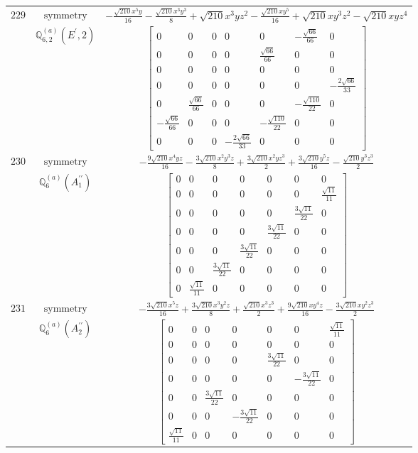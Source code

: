 \documentclass[fleqn,8pt,landscape]{jsarticle}
\begin{document}
\begin{longtable}{ccc}
$ 229 $ & $ \text{symmetry} $ & $ - \frac{\sqrt{210} x^{5} y}{16} - \frac{\sqrt{210} x^{3} y^{3}}{8} + \sqrt{210} x^{3} y z^{2} - \frac{\sqrt{210} x y^{5}}{16} + \sqrt{210} x y^{3} z^{2} - \sqrt{210} x y z^{4} $ \\
$  $ & $ \mathbb{Q}_{6,2}^{(a)}(E^{\prime},2) $ & $ \begin{bmatrix} 0 & 0 & 0 & 0 & 0 & - \frac{\sqrt{66}}{66} & 0 \\ 0 & 0 & 0 & 0 & \frac{\sqrt{66}}{66} & 0 & 0 \\ 0 & 0 & 0 & 0 & 0 & 0 & 0 \\ 0 & 0 & 0 & 0 & 0 & 0 & - \frac{2 \sqrt{66}}{33} \\ 0 & \frac{\sqrt{66}}{66} & 0 & 0 & 0 & - \frac{\sqrt{110}}{22} & 0 \\ - \frac{\sqrt{66}}{66} & 0 & 0 & 0 & - \frac{\sqrt{110}}{22} & 0 & 0 \\ 0 & 0 & 0 & - \frac{2 \sqrt{66}}{33} & 0 & 0 & 0 \end{bmatrix} $ \\ \hline
$ 230 $ & $ \text{symmetry} $ & $ - \frac{9 \sqrt{210} x^{4} y z}{16} - \frac{3 \sqrt{210} x^{2} y^{3} z}{8} + \frac{3 \sqrt{210} x^{2} y z^{3}}{2} + \frac{3 \sqrt{210} y^{5} z}{16} - \frac{\sqrt{210} y^{3} z^{3}}{2} $ \\
$  $ & $ \mathbb{Q}_{6}^{(a)}(A_{1}^{\prime\prime}) $ & $ \begin{bmatrix} 0 & 0 & 0 & 0 & 0 & 0 & 0 \\ 0 & 0 & 0 & 0 & 0 & 0 & \frac{\sqrt{11}}{11} \\ 0 & 0 & 0 & 0 & 0 & \frac{3 \sqrt{11}}{22} & 0 \\ 0 & 0 & 0 & 0 & \frac{3 \sqrt{11}}{22} & 0 & 0 \\ 0 & 0 & 0 & \frac{3 \sqrt{11}}{22} & 0 & 0 & 0 \\ 0 & 0 & \frac{3 \sqrt{11}}{22} & 0 & 0 & 0 & 0 \\ 0 & \frac{\sqrt{11}}{11} & 0 & 0 & 0 & 0 & 0 \end{bmatrix} $ \\ \hline
$ 231 $ & $ \text{symmetry} $ & $ - \frac{3 \sqrt{210} x^{5} z}{16} + \frac{3 \sqrt{210} x^{3} y^{2} z}{8} + \frac{\sqrt{210} x^{3} z^{3}}{2} + \frac{9 \sqrt{210} x y^{4} z}{16} - \frac{3 \sqrt{210} x y^{2} z^{3}}{2} $ \\
$  $ & $ \mathbb{Q}_{6}^{(a)}(A_{2}^{\prime\prime}) $ & $ \begin{bmatrix} 0 & 0 & 0 & 0 & 0 & 0 & \frac{\sqrt{11}}{11} \\ 0 & 0 & 0 & 0 & 0 & 0 & 0 \\ 0 & 0 & 0 & 0 & \frac{3 \sqrt{11}}{22} & 0 & 0 \\ 0 & 0 & 0 & 0 & 0 & - \frac{3 \sqrt{11}}{22} & 0 \\ 0 & 0 & \frac{3 \sqrt{11}}{22} & 0 & 0 & 0 & 0 \\ 0 & 0 & 0 & - \frac{3 \sqrt{11}}{22} & 0 & 0 & 0 \\ \frac{\sqrt{11}}{11} & 0 & 0 & 0 & 0 & 0 & 0 \end{bmatrix} $ \\ \hline

\end{longtable}
\end{document}
